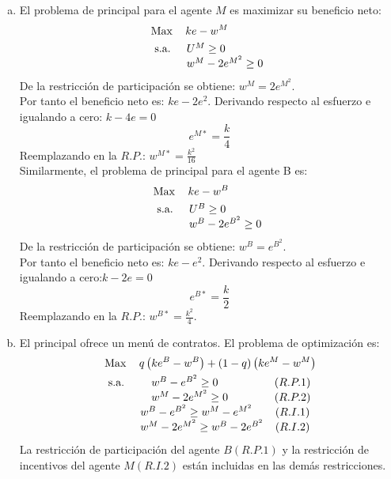 \begin{enumerate}[a)]
	\item El problema de principal para el agente $M$ es maximizar su beneficio neto: 
	\begin{align*}
		& \operatorname*{Max} \quad k e-w^{M}\\
		& \begin{array}{ll}
			\text{s.a. } & U^{M} \geq 0\\
			& w^{M}-2 e^{M^{2}} \geq 0
		\end{array}
	\end{align*}
	De la restricción de participación se obtiene: $w^{M}=2 e^{M^{2}}$.\\
	
	Por tanto el beneficio neto es: $k e-2e^{2}$. Derivando respecto al esfuerzo e igualando a cero: $k-4e=0$ 
	$$e^{M*}=\frac{k}{4}$$
	Reemplazando en la $R.P.$: $w^{M*} =\frac{k^{2}}{16}$\\
	
	Similarmente, el problema de principal para el agente B es:
	\begin{align*}
		& \operatorname*{Max} \quad k e-w^{B}\\
		& \begin{array}{ll}
			\text{s.a. } & U^{B} \geq 0\\
			& w^{B}-2e^{B^{2}} \geq 0
		\end{array}
	\end{align*}
	De la restricción de participación se obtiene: $w^{B}=e^{B^{2}}$.\\
	
	Por tanto el beneficio neto es: $ke-e^{2}$. Derivando respecto al esfuerzo e igualando a cero:$k-2e=0$
	$$e^{B*}=\frac{k}{2}$$
	Reemplazando en la $R.P.$: $w^{B*}=\frac{k^{2}}{4}$.
	\item El principal ofrece un menú de contratos. El problema de optimización es: 
	\begin{align*}
		& \operatorname*{Max} \quad q\left(ke^{B}-w^{B}\right)+(1-q)\left(ke^{M}-w^{M}\right)\\
		& \begin{array}{llc}
			\text{s.a. } & \quad w^{B}-e^{B^{2}} \geq 0 & (R.P.1)\\
			& \quad w^{M}-2 e^{M^{2}} \geq 0 & (R.P.2) \\
			& w^{B}-e^{B^{2}} \geq w^{M}-e^{M^{2}} & (R.I.1) \\
			& w^{M}-2 e^{M^{2}} \geq w^{B}-2 e^{B^{2}} & (R.I.2)
		\end{array}
	\end{align*}
	La restricción de participación del agente $B (R.P.1)$ y la restricción de incentivos del agente $M (R.I.2)$ están incluidas en las demás restricciones.\\
	

\end{enumerate}
